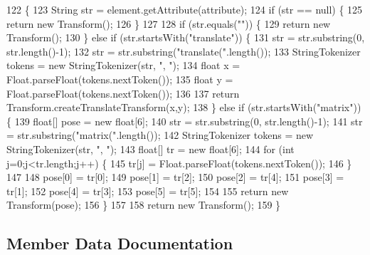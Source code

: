 \begin{DoxyCode}
122                                                                      \{
123         String str = element.getAttribute(attribute);
124         \textcolor{keywordflow}{if} (str == null) \{
125             \textcolor{keywordflow}{return} \textcolor{keyword}{new} Transform();
126         \}
127         
128         \textcolor{keywordflow}{if} (str.equals(\textcolor{stringliteral}{""})) \{
129             \textcolor{keywordflow}{return} \textcolor{keyword}{new} Transform();
130         \} \textcolor{keywordflow}{else} \textcolor{keywordflow}{if} (str.startsWith(\textcolor{stringliteral}{"translate"})) \{
131             str = str.substring(0, str.length()-1);
132             str = str.substring(\textcolor{stringliteral}{"translate("}.length());
133             StringTokenizer tokens = \textcolor{keyword}{new} StringTokenizer(str, \textcolor{stringliteral}{", "});
134             \textcolor{keywordtype}{float} x = Float.parseFloat(tokens.nextToken());
135             \textcolor{keywordtype}{float} y = Float.parseFloat(tokens.nextToken());
136             
137             \textcolor{keywordflow}{return} Transform.createTranslateTransform(x,y);
138         \} \textcolor{keywordflow}{else} \textcolor{keywordflow}{if} (str.startsWith(\textcolor{stringliteral}{"matrix"})) \{
139             \textcolor{keywordtype}{float}[] pose = \textcolor{keyword}{new} \textcolor{keywordtype}{float}[6];
140             str = str.substring(0, str.length()-1);
141             str = str.substring(\textcolor{stringliteral}{"matrix("}.length());
142             StringTokenizer tokens = \textcolor{keyword}{new} StringTokenizer(str, \textcolor{stringliteral}{", "});
143             \textcolor{keywordtype}{float}[] tr = \textcolor{keyword}{new} \textcolor{keywordtype}{float}[6];
144             \textcolor{keywordflow}{for} (\textcolor{keywordtype}{int} j=0;j<tr.length;j++) \{
145                 tr[j] = Float.parseFloat(tokens.nextToken());
146             \}
147             
148             pose[0] = tr[0];
149             pose[1] = tr[2];
150             pose[2] = tr[4];
151             pose[3] = tr[1];
152             pose[4] = tr[3];
153             pose[5] = tr[5];
154             
155             \textcolor{keywordflow}{return} \textcolor{keyword}{new} Transform(pose);
156         \}
157         
158         \textcolor{keywordflow}{return} \textcolor{keyword}{new} Transform();
159     \}
\end{DoxyCode}


\subsection{Member Data Documentation}
\mbox{\label{classorg_1_1newdawn_1_1slick_1_1svg_1_1inkscape_1_1_util_af7a7fcda04b0fd373a2ed92aa5e26cdc}} 
